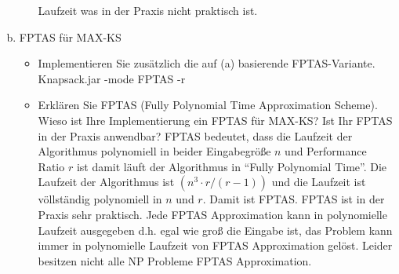 \documentclass{article}
\begin{document}
\begin{flushleft}
\begin{enumerate}[(a)]
\begin{itemize}
        Laufzeit was in der Praxis nicht praktisch ist.
    \end{itemize}
    \item FPTAS für MAX-KS
    \begin{itemize}
        \item Implementieren Sie zusätzlich die auf (a) basierende FPTAS-Variante.
        \newline Knapsack.jar -mode FPTAS -r
        \item Erklären Sie FPTAS (Fully Polynomial Time Approximation Scheme). Wieso ist Ihre Implementierung
        ein FPTAS für MAX-KS? Ist Ihr FPTAS in der Praxis anwendbar?
        \newline
        FPTAS bedeutet, dass die Laufzeit der Algorithmus polynomiell in beider Eingabegröße $n$ und Performance Ratio $r$
        ist damit läuft der Algorithmus in ``Fully Polynomial Time''.
        \newline
        Die Laufzeit der Algorithmus ist $(n^3 \cdot r/(r-1))$ und die Laufzeit ist völlständig polynomiell in $n$ und $r$.
        Damit ist FPTAS.
        \newline
        FPTAS ist in der Praxis sehr praktisch. Jede FPTAS Approximation kann in polynomielle Laufzeit ausgegeben d.h.
        egal wie groß die Eingabe ist, das Problem kann immer in polynomielle Laufzeit von FPTAS Approximation gelöst.
        Leider besitzen nicht alle NP Probleme FPTAS Approximation. 
    \end{itemize}
\end{enumerate}
\end{flushleft}
\end{document}
